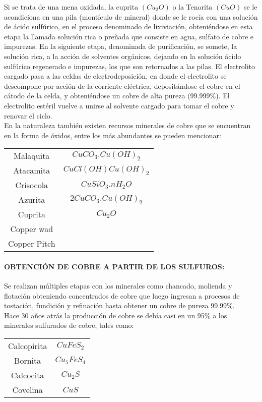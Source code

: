 Si se trata de una mena oxidada, la cuprita $(Cu_2O)$ o la Tenorita $(CuO)$ se le acondiciona en una pila (mont\'iculo de mineral) donde se le roc\'ia con una soluci\'on de \'acido sulf\'urico, en el proceso denominado de lixiviaci\'on, obteni\'endose en esta etapa la llamada soluci\'on rica o pre\~nada que consiste en agua, sulfato de cobre e impurezas. En la siguiente etapa, denominada de purificaci\'on, se somete, la soluci\'on rica, a la acci\'on de solventes org\'anicos, dejando en la soluci\'on \'acido sulf\'urico regenerado e impurezas, los que son retornados a las pilas. El electrolito cargado pasa a las celdas de electrodeposici\'on, en donde el electrolito se descompone por acci\'on de la corriente el\'ectrica, deposit\'andose el cobre en el c\'atodo de la celda, y obteni\'endose un cobre de alta pureza (99.999\%). El electrolito est\'eril vuelve a unirse al solvente cargado para tomar el cobre y renovar el ciclo.\\
En la naturaleza tambi\'en existen recursos minerales de cobre que se encuentran en la forma de \'oxidos, entre los m\'as abundantes se pueden mencionar:\\

\begin{tabular}{cc}
Malaquita&$CuCO_3.Cu(OH)_2$\\
Atacamita&$CuCl(OH)Cu(OH)_2$\\
Crisocola&$CuSiO_3.nH_2O$\\
Azurita&	$2CuCO_3.Cu(OH)_2$\\
Cuprita&	$Cu_2O$\\
Copper wad& \\
Copper Pitch& \\
\end{tabular}

\paragraph{OBTENCI\'ON DE COBRE A PARTIR DE LOS SULFUROS:}

Se realizan m\'ultiples etapas con los minerales como chancado, molienda y flotaci\'on obteniendo concentrados de cobre que luego ingresan a procesos de tostaci\'on, fundici\'on y refinaci\'on hasta obtener un cobre de pureza 99.99\%.\\
Hace 30 a\~nos atr\'as la producci\'on de cobre se deb\'ia casi en un 95\% a los minerales sulfurados de cobre, tales como:\\

\begin{tabular}{cc}
 Calcopirita&$CuFeS_2$\\
Bornita&$Cu_5FeS_4$\\
Calcocita&$Cu_2S$\\
Covelina&$CuS$\\
\end{tabular}
 \\
 
